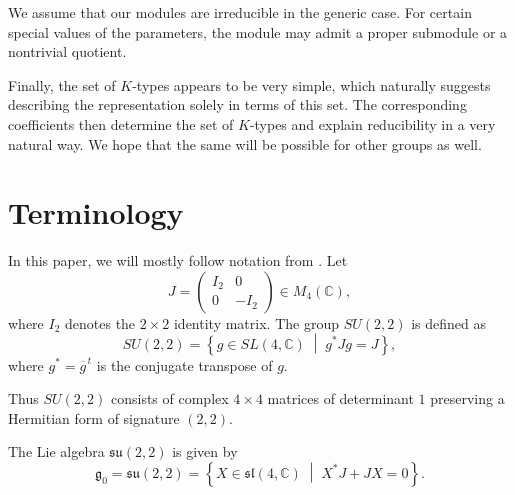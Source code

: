 \documentclass[twoside,a4paper,12pt]{article}
\newcommand{\go}{\ensuremath{{\mathfrak g}_0}}
\theoremstyle{definition}
\begin{document}
We assume that our modules are irreducible in the generic case. For certain
special values of the parameters, the module may admit a proper submodule or a
nontrivial quotient.

Finally, the set of $K$-types appears to be very simple, which naturally
suggests describing the representation solely in terms of this set. The
corresponding coefficients then determine the set of $K$-types and explain
reducibility in a very natural way. We hope that the same will be possible for
other groups as well.



\section{Terminology}\label{term}

In this paper, we will mostly follow notation from \cite{kn}. Let 
\[ J = \begin{pmatrix}
	I_2 & 0 \\
	0 & -I_2\end{pmatrix} \in M_{4}(\mathbb{C}), \]
where $I_2$ denotes the $2 \times 2$ identity matrix. The group $SU(2,2)$ is
defined as
\[ SU(2,2) = \left\{g \in SL(4,\mathbb{C}) \;\middle|\; g^* J g = J\right\}, \]
where $g^* = \overline{g}^{\,t}$ is the conjugate transpose of $g$.

Thus $SU(2,2)$ consists of complex $4 \times 4$ matrices of determinant $1$
preserving a Hermitian form of signature $(2,2)$.

The Lie algebra $\mathfrak{su}(2,2)$ is given by
\[ \go=\mathfrak{su}(2,2)=\left\{X \in \mathfrak{sl}(4,\mathbb{C})\;\middle|\;
	X^* J + J X = 0\right\}.\]
\end{document}
